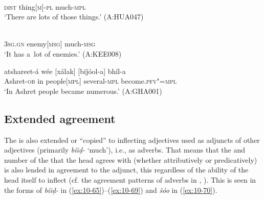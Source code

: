 \begin{exe}
\ex
\label{ex:10-62}
 \\
\textsc{dist} thing[\textsc{m}]-\textsc{pl} much-\textsc{mpl} \\
\glt `There are lots of those things.' (A:HUA047)

\ex
\label{ex:10-63}
 \\
\textsc{3sg.gn} enemy[\textsc{msg}] much-\textsc{msg} \\
\glt `It has a~lot of enemies.' (A:KEE008)

\ex
\label{ex:10-64}
\gll atshareet-á wée [xálak] [biǰóol-a] bhíl-a \\
Ashret-\textsc{ob} in people[\textsc{mpl}] several-\textsc{mpl} become.\textsc{pfv"=mpl} \\
\glt `In Ashret people became numerous.' (A:GHA001)
\end{exe}

\subsection{Extended agreement}
\label{subsec:10-3-4}


The  is also extended or ``copied'' to inflecting adjectives used as adjuncts of other adjectives (primarily \textit{bíiḍ-} `much'), i.e., as adverbs. That means that the  and number of the  that the  head agrees with (whether attributively or predicatively) is also lended in agreement to the  adjunct, this regardless of the ability of the  head itself to inflect (cf. the agreement patterns of adverbs in , \citealt{hookjoshi1991}). This is seen in the forms of \textit{bíiḍ-} in (\ref{ex:10-65})--(\ref{ex:10-69}) and \textit{šóo} in (\ref{ex:10-70}).

